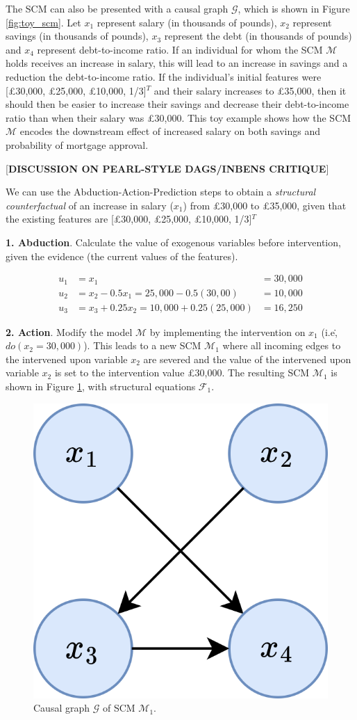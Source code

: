 The SCM can also be presented with a causal graph $\mathcal{G}$, which is shown in Figure \ref{fig:toy_scm}. Let $x_1$ represent salary (in thousands of pounds), $x_2$ represent savings (in thousands of pounds), $x_3$ represent the debt (in thousands of pounds) and $x_4$ represent debt-to-income ratio. If an individual for whom the SCM $\mathcal{M}$ holds receives an increase in salary, this will lead to an increase in savings and a reduction the debt-to-income ratio. If the individual's initial features were [£30,000, £25,000, £10,000, 1/3]$^T$ and their salary increases to £35,000, then it should then be easier to increase their savings and decrease their debt-to-income ratio than when their salary was £30,000. This toy example shows how the SCM $\mathcal{M}$ encodes the downstream effect of increased salary on both savings and probability of mortgage approval.

[\textbf{DISCUSSION ON PEARL-STYLE DAGS/INBENS CRITIQUE}]

We can use the Abduction-Action-Prediction steps \citep{pearl2016causal} to obtain a \textit{structural counterfactual} of an increase in salary ($x_1$) from £30,000 to £35,000, given that the existing features are [£30,000, £25,000, £10,000, 1/3]$^T$ 

\textbf{1. Abduction}. Calculate the value of exogenous variables before intervention, given the evidence (the current values of the features).

\begin{align}
	u_1 & = x_1 & =  30,000 \\ \nonumber
	u_2 & = x_2 - 0.5x_1 = 25,000 - 0.5(30,00) & = 10,000 \\ \nonumber
	u_3 & = x_3 + 0.25x_2 = 10,000 + 0.25(25,000) & = 16,250
\end{align}

\textbf{2. Action}. Modify the model $\mathcal{M}$ by implementing the intervention on $x_1$ (i.e\., $do(x_2=30,000)$). This leads to a new SCM $\mathcal{M}_1$ where all incoming edges to the intervened upon variable $x_2$ are severed and the value of the intervened upon variable $x_2$ is set to the intervention value £30,000. The resulting SCM $\mathcal{M}_1$ is shown in Figure \ref{fig:toy_scm_severed}, with structural equations $\mathcal{F}_1$.

\begin{figure}[!htb]
	\centering
	\includegraphics[width=0.25\linewidth]{images/draw.io/Simple SCM Severed.png}
	\caption{Causal graph $\mathcal{G}$ of SCM $\mathcal{M}_1$.}
	\label{fig:toy_scm_severed}
\end{figure}

